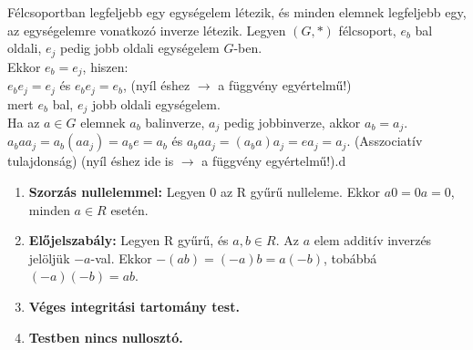 \begin{frame}
\begin{tcolorbox}[title={Tétel: Egységelem és inverz félcsoportban}]
Félcsoportban legfeljebb egy egységelem létezik, és minden elemnek legfeljebb egy, az egységelemre vonatkozó inverze létezik.
\tcblower
Legyen $(G, *)$ félcsoport, $e_b$ bal oldali, $e_j$ pedig jobb oldali egységelem $G$-ben.\\
Ekkor $e_b = e_j$, hiszen:\\
$e_be_j = e_j$ és $e_be_j = e_b$, (nyíl éshez $\rightarrow$ a függvény egyértelmű!)\\
mert $e_b$ bal, $e_j$ jobb oldali egységelem.\\
Ha az $a \in G$ elemnek $a_b$ balinverze, $a_j$ pedig jobbinverze, akkor $a_b = a_j$.
$a_baa_j = a_b(aa_j) = a_be = a_b$ és $a_baa_j = (a_ba)a_j = ea_j = a_j$. (Asszociatív tulajdonság) (nyíl éshez ide is $\rightarrow$ a függvény egyértelmű!).d
\end{tcolorbox}
\end{frame}

\begin{frame}
\begin{tcolorbox}[title={Def.: Abel-csoport}]
\end{tcolorbox}

\begin{tcolorbox}[title={Def.: $n$ tényezős szorzat / Hatványozás egész kitevővel}]
\end{tcolorbox}
\end{frame}

\begin{frame}

\begin{tcolorbox}[title={Def.: Gyűrűk}]

\end{tcolorbox}
\end{frame}

\begin{frame}
\begin{tcolorbox}[title={Algebrai struktúrák kpacsolata (Kép)}]
\end{tcolorbox}
\end{frame}

\begin{frame}
\begin{tcolorbox}[title={Lemma: Észrevételek gyűrűkben}]
\begin{enumerate}
\item \textbf{Szorzás nullelemmel:} Legyen 0 az R gyűrű nulleleme. Ekkor $a0 = 0a = 0$, minden $a \in R$ esetén.
\item \textbf{Előjelszabály:} Legyen R gyűrű, és $a, b \in R$. Az $a$ elem additív inverzés jelöljük $-a$-val. Ekkor $-(ab) = (-a)b = a(-b)$, tobábbá $(-a)(-b) = ab$.
\item \textbf{Véges integritási tartomány test.}
\item \textbf{Testben nincs nullosztó.}
\end{enumerate}
\end{tcolorbox}
\end{frame}

